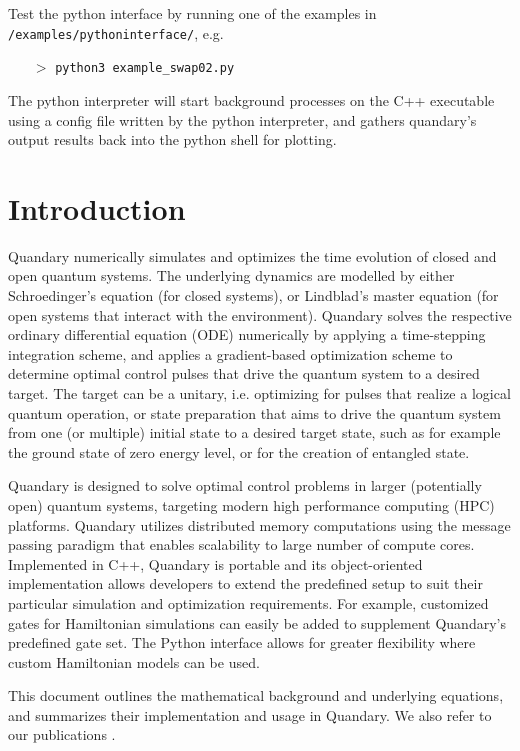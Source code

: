 \documentclass[11pt]{article}
\begin{document}
Test the python interface by running one of the examples in \texttt{/examples/pythoninterface/}, e.g. 
\begin{itemize}
  \item[$>$]  \texttt{python3 example\_swap02.py}
\end{itemize}
 The python interpreter will start background processes on the C++ executable using a config file written by the python interpreter, and gathers quandary's output results back into the python shell for plotting.

\tableofcontents

\section{Introduction}
Quandary numerically simulates and optimizes the time evolution of closed and open quantum systems. The
underlying dynamics are modelled by either Schroedinger's equation (for closed systems), or Lindblad's master equation (for open systems that interact with the environment). Quandary solves the respective ordinary differential equation (ODE) numerically by applying a time-stepping integration scheme, and applies a gradient-based optimization
scheme to determine optimal control pulses that drive the quantum system to a desired target.
The target can be a unitary, i.e. optimizing for pulses that
realize a logical quantum operation, or state preparation that aims to drive the quantum system from one (or multiple) initial state to a desired target state, such as for example the ground state of zero energy level, or for the creation of entangled state. 

Quandary is designed to solve optimal control problems in larger (potentially open) quantum systems, targeting modern high performance computing (HPC) platforms. Quandary utilizes distributed memory computations using the message passing paradigm that enables scalability to large number of compute cores. Implemented in C++, Quandary is portable and its object-oriented implementation allows developers to extend the predefined setup to suit their particular simulation and optimization requirements. For example, customized gates for Hamiltonian simulations can easily be added to supplement Quandary’s predefined gate set. 
The Python interface allows for greater flexibility where custom Hamiltonian models can be used.

This document outlines the mathematical background and underlying equations, and summarizes their
implementation and usage in Quandary. We also refer to our publications \cite{guenther2021quandary, guenther2021quantum}.
\end{document}
